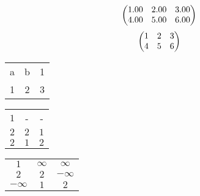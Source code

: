 \begin{align*}
  \begin{pmatrix}
    $1.00$ & $2.00$ & $3.00$\\
    $4.00$ & $5.00$ & $6.00$\\
  \end{pmatrix}
\end{align*}
\begin{align*}
  \begin{pmatrix}
    $1$ & $2$ & $3$\\
    $4$ & $5$ & $6$\\
  \end{pmatrix}
\end{align*}
\begin{table}[ht]
  \begin{center}
    \begin{tabular}{ccc}
      \toprule
      a & b & 1\\
      1 & 2 & 3\\
      \bottomrule
    \end{tabular}
  \end{center}
\end{table}
\begin{table}[ht]
  \begin{center}
    \begin{tabular}{ccc}
      \toprule
      $1$ & - & -\\
      $2$ & $2$ & $1$\\
      $2$ & $1$ & $2$\\
      \bottomrule
    \end{tabular}
  \end{center}
\end{table}
\begin{table}[ht]
  \begin{center}
    \begin{tabular}{ccc}
      \toprule
      $1$ & $\infty$ & $\infty$\\
      $2$ & $2$ & $-\infty$\\
      $-\infty$ & $1$ & $2$\\
      \bottomrule
    \end{tabular}
  \end{center}
\end{table}
\begin{table}[ht]
  \begin{center}
    \begin{tabular}{c}
      \toprule
      \bottomrule
    \end{tabular}
  \end{center}
\end{table}

